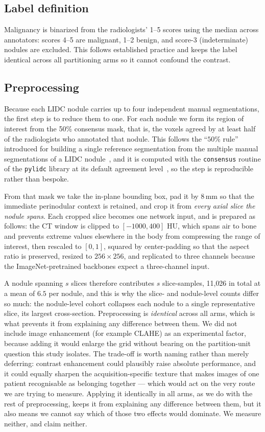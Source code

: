 \documentclass{ieeeaccess}
\newcommand{\vcite}[1]{\cite{#1}}
\begin{document}
\subsection{Label definition}
Malignancy is binarized from the radiologists' 1--5 scores using the median across annotators:
scores 4--5 are malignant, 1--2 benign, and score-3 (indeterminate) nodules are excluded. This
follows established practice and keeps the label identical across all partitioning arms so it
cannot confound the contrast.

\subsection{Preprocessing}
Because each LIDC nodule carries up to four independent manual segmentations, the first step is to
reduce them to one. For each nodule we form its region of interest from the 50\% consensus mask, that
is, the voxels agreed by at least half of the radiologists who annotated that nodule. This follows
the ``$50\%$ rule'' introduced for building a single reference segmentation from the multiple manual
segmentations of a LIDC nodule~\vcite{kubota2011}, and it is computed with the \texttt{consensus}
routine of the \texttt{pylidc} library at its default agreement level~\vcite{hancock2016}, so the
step is reproducible rather than bespoke.

From that mask we take the in-plane bounding box, pad it by $8$\,mm so that the immediate
perinodular context is retained, and crop it from \emph{every axial slice the nodule spans}. Each
cropped slice becomes one network input, and is prepared as follows: the CT window is clipped to
$[-1000,400]$ HU, which spans air to bone and prevents extreme values elsewhere in the body from
compressing the range of interest, then rescaled to $[0,1]$, squared by center-padding so that the
aspect ratio is preserved, resized to $256\times256$, and replicated to three channels because the
ImageNet-pretrained backbones expect a three-channel input.

A nodule spanning $s$ slices therefore contributes $s$ slice-samples, 11{,}026 in total at a mean of
$6.5$ per nodule, and this is why the slice- and nodule-level counts differ so much: the nodule-level
cohort collapses each nodule to a single representative slice, its largest cross-section.
Preprocessing is \emph{identical} across all arms, which is what prevents it from explaining any
difference between them. We did not include image enhancement (for example CLAHE) as an experimental
factor, because adding it would enlarge the grid without bearing on the partition-unit question this
study isolates. The trade-off is worth naming rather than merely deferring: contrast enhancement
could plausibly raise absolute performance, and it could equally sharpen the acquisition-specific
texture that makes images of one patient recognisable as belonging together --- which would act on
the very route we are trying to measure. Applying it identically in all arms, as we do with the rest
of preprocessing, keeps it from explaining any difference between them, but it also means we cannot
say which of those two effects would dominate. We measure neither, and claim neither.
\end{document}
